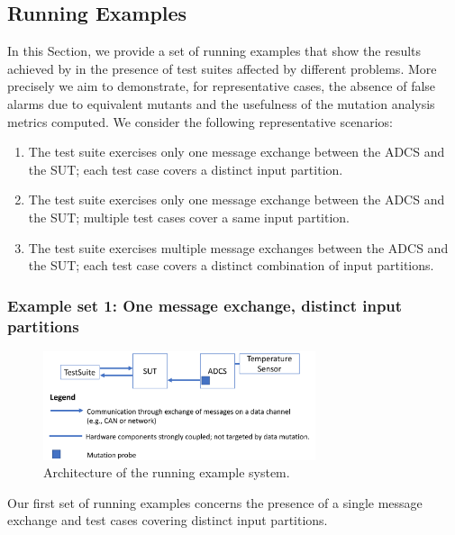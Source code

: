 \clearpage
\subsection{Running Examples}
\label{sec:dataDriven:example}

In this Section, we provide a set of running examples that show the results achieved by \APPR in the presence of test suites affected by different problems. More precisely we aim to demonstrate, for representative cases, the absence of false alarms due to equivalent mutants and the usefulness of the mutation analysis metrics computed. 
We consider the following representative scenarios:
\begin{enumerate}
\item The test suite exercises only one message exchange between the ADCS and the SUT; each test case covers a distinct input partition.
\item The test suite exercises only one message exchange between the ADCS and the SUT; multiple test cases cover a same input partition.
\item The test suite exercises multiple message exchanges between the ADCS and the SUT; each test case covers a distinct combination of input partitions.
\end{enumerate}


\subsubsection{Example set 1: One message exchange, distinct input partitions}
\label{sec:dataDriven:example:1}

\begin{figure}[tb]
\centering
\includegraphics[width=8cm]{damat/RunningExampleArch}
\caption{Architecture of the running example system.}
\label{fig:damat:RunningExampleArch}
\end{figure}

Our first set of running examples concerns the presence of a single message exchange and test cases covering distinct input partitions.

